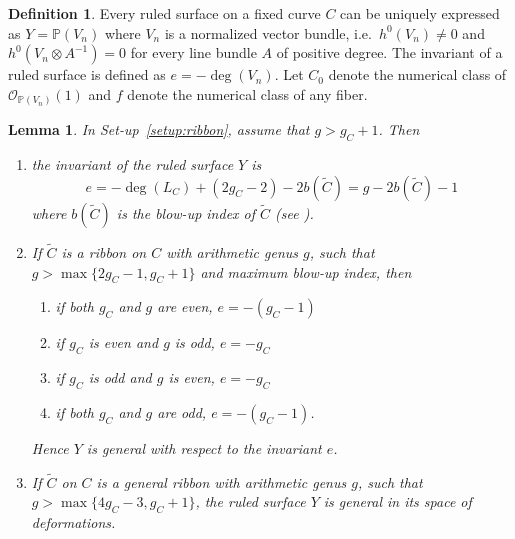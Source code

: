 \documentclass[11pt,reqno]{amsart}
\theoremstyle{plain}
\newtheorem{lemma}[theorem]{Lemma}
\theoremstyle{definition}
\newtheorem{definition}[theorem]{Definition}
\newcommand{\PP}{\mathbb{P}}
\newcommand{\OO}{\mathcal{O}}
\newcommand{\Ct}{\widetilde{C}}
\begin{document}
\begin{definition}\label{def:invariant}
Every ruled surface on a fixed curve $C$ can be uniquely expressed as $Y=\PP(V_n)$ where $V_n$ is a normalized vector bundle, i.e.\ $h^0(V_n)\neq0$ and $h^0(V_n\otimes A^{-1})=0$ for every line bundle $A$ of positive degree. The invariant of a ruled surface is defined as $e=-\deg(V_n)$. Let $C_0$ denote the numerical class of $\OO_{\PP(V_n)}(1)$ and $f$ denote the numerical class of any fiber.
\end{definition}

\begin{lemma}\label{lem:invariant}
In Set-up~\ref{setup:ribbon}, assume that $g>g_C+1$. Then
\begin{enumerate}
\item the invariant of the ruled surface $Y$ is
\[
e=-\deg(L_C)+(2g_C-2)-2b(\Ct)=g-2b(\Ct)-1
\]
where $b(\Ct)$ is the blow-up index of $\Ct$ (see \cite{DM24}).
\item If $\Ct$ is a ribbon on $C$ with arithmetic genus $g$, such that $g>\max\{2g_C-1,g_C+1\}$ and maximum blow-up index, then
\begin{enumerate}
\item if both $g_C$ and $g$ are even, $e=-(g_C-1)$
\item if $g_C$ is even and $g$ is odd, $e=-g_C$
\item if $g_C$ is odd and $g$ is even, $e=-g_C$
\item if both $g_C$ and $g$ are odd, $e=-(g_C-1)$.
\end{enumerate}
Hence $Y$ is general with respect to the invariant $e$.
\item If $\Ct$ on $C$ is a general ribbon with arithmetic genus $g$, such that $g>\max\{4g_C-3,g_C+1\}$, the ruled surface $Y$ is general in its space of deformations.
\end{enumerate}
\end{lemma}
\end{document}
